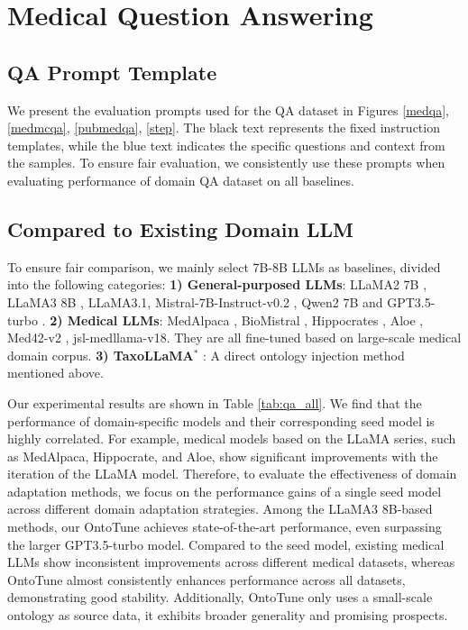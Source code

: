 \section{Medical Question Answering}\label{app:c}
\subsection{QA Prompt Template}
We present the evaluation prompts used for the QA dataset in Figures \ref{medqa}, \ref{medmcqa}, \ref{pubmedqa}, \ref{step}. The black text represents the fixed instruction templates, while the blue text indicates the specific questions and context from the samples. To ensure fair evaluation, we consistently use these prompts when evaluating performance of domain QA dataset on all baselines.

\subsection{Compared to Existing Domain LLM}
To ensure fair comparison, we mainly select 7B-8B LLMs as baselines, divided into the following categories: \textbf{1) General-purposed LLMs}: LLaMA2 7B \cite{DBLP:journals/corr/abs-2307-09288}, LLaMA3 8B \cite{dubey2024llama}, LLaMA3.1, Mistral-7B-Instruct-v0.2 \cite{DBLP:journals/corr/abs-2310-06825}, Qwen2 7B \cite{DBLP:journals/corr/abs-2407-10671} and GPT3.5-turbo . \textbf{2) Medical LLMs}: MedAlpaca \cite{DBLP:journals/corr/abs-2304-08247}, BioMistral \cite{DBLP:conf/acl/LabrakBMGRD24}, Hippocrates \cite{DBLP:journals/corr/abs-2404-16621}, Aloe \cite{DBLP:journals/corr/abs-2405-01886}, Med42-v2 \cite{DBLP:journals/corr/abs-2408-06142}, jsl-medllama-v18. They are all fine-tuned based on large-scale medical domain corpus. \textbf{3) TaxoLLaMA$^*$} \cite{DBLP:conf/acl/MoskvoretskiiNL24}: A direct ontology injection method mentioned above.

Our experimental results are shown in Table \ref{tab:qa_all}. We find that the performance of domain-specific models and their corresponding seed model is highly correlated. For example, medical models based on the LLaMA series, such as MedAlpaca, Hippocrate, and Aloe, show significant improvements with the iteration of the LLaMA model. Therefore, to evaluate the effectiveness of domain adaptation methods, we focus on the performance gains of a single seed model across different domain adaptation strategies. Among the LLaMA3 8B-based methods, our OntoTune achieves state-of-the-art performance, even surpassing the larger GPT3.5-turbo model. Compared to the seed model, existing medical LLMs show inconsistent improvements across different medical datasets, whereas OntoTune almost consistently enhances performance across all datasets, demonstrating good stability. Additionally, OntoTune only uses a small-scale ontology as source data, it exhibits broader generality and promising prospects.




